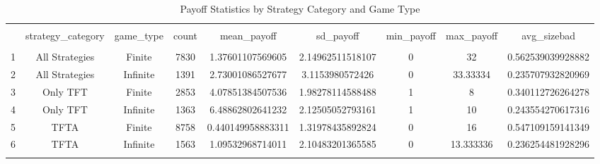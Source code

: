 
\begin{table}[!htbp] \centering 
  \caption{Payoff Statistics by Strategy Category and Game Type} 
  \label{} 
\begin{tabular}{@{\extracolsep{5pt}} ccccccccc} 
\\[-1.8ex]\hline 
\hline \\[-1.8ex] 
 & strategy\_category & game\_type & count & mean\_payoff & sd\_payoff & min\_payoff & max\_payoff & avg\_sizebad \\ 
\hline \\[-1.8ex] 
1 & All Strategies & Finite & 7830 & 1.37601107569605 & 2.14962511518107 & 0 & 32 & 0.562539039928882 \\ 
2 & All Strategies & Infinite & 1391 & 2.73001086527677 & 3.1153980572426 & 0 & 33.33334 & 0.235707932820969 \\ 
3 & Only TFT & Finite & 2853 & 4.07851384507536 & 1.98278114588488 & 1 & 8 & 0.340112726264278 \\ 
4 & Only TFT & Infinite & 1363 & 6.48862802641232 & 2.12505052793161 & 1 & 10 & 0.243554270617316 \\ 
5 & TFTA & Finite & 8758 & 0.440149958883311 & 1.31978435892824 & 0 & 16 & 0.547109159141349 \\ 
6 & TFTA & Infinite & 1563 & 1.09532968714011 & 2.10483201365585 & 0 & 13.333336 & 0.236254481928296 \\ 
\hline \\[-1.8ex] 
\end{tabular} 
\end{table} 
